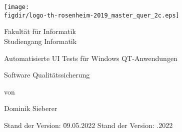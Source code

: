 \begin{titlepage}

\sffamily

\raggedleft

\vspace*{-2cm}

\texttt{[image: \\figdir/logo-th-rosenheim-2019\_master\_quer\_2c.eps]}

\vfill

\centering
\LARGE
Fakultät für Informatik  \vspace{0.5cm}\\
\Large
Studiengang Informatik

\vspace{2cm}

\LARGE

\centerline{Automatisierte UI Tests für Windows QT-Anwendungen}	 


\vspace{2cm}

\Large
Software Qualitätssicherung

\vspace{1.5cm}


\Large
von

\vspace{0.5cm}


\LARGE
Dominik Sieberer \vspace{1cm}

\vspace{1cm}

\flushleft
 \Large
\vspace*{\fill}

\begin{tabbing}
Stand der Version: \= 09.05.2022 \kill
Stand der Version: .2022 \\
\end{tabbing}

\end{titlepage}

\cleardoubleemptypage









